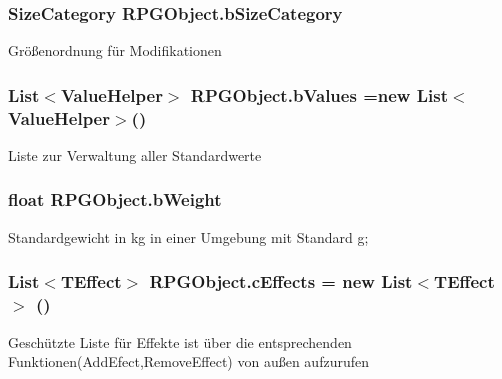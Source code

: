 \subsubsection[{b\+Size\+Category}]{\setlength{\rightskip}{0pt plus 5cm}Size\+Category R\+P\+G\+Object.\+b\+Size\+Category\hspace{0.3cm}{\ttfamily [protected]}}\label{class_r_p_g_object_ae5cb76ccbe4f37237cc03a9737009577}
Größenordnung für Modifikationen \hypertarget{class_r_p_g_object_aca7f376707b78c0852b0001ee67dc80f}{}
\subsubsection[{b\+Values}]{\setlength{\rightskip}{0pt plus 5cm}List$<${\bf Value\+Helper}$>$ R\+P\+G\+Object.\+b\+Values =new List$<${\bf Value\+Helper}$>$()\hspace{0.3cm}{\ttfamily [protected]}}\label{class_r_p_g_object_aca7f376707b78c0852b0001ee67dc80f}
Liste zur Verwaltung aller Standardwerte \hypertarget{class_r_p_g_object_a550507f127d2915aa0b7a95ef5e3feb6}{}
\subsubsection[{b\+Weight}]{\setlength{\rightskip}{0pt plus 5cm}float R\+P\+G\+Object.\+b\+Weight\hspace{0.3cm}{\ttfamily [protected]}}\label{class_r_p_g_object_a550507f127d2915aa0b7a95ef5e3feb6}
Standardgewicht in kg in einer Umgebung mit Standard g; \hypertarget{class_r_p_g_object_a833cf33788a1040a7fdcb703d6e3126d}{}
\subsubsection[{c\+Effects}]{\setlength{\rightskip}{0pt plus 5cm}List$<${\bf T\+Effect}$>$ R\+P\+G\+Object.\+c\+Effects = new List$<${\bf T\+Effect}$>$ ()\hspace{0.3cm}{\ttfamily [protected]}}\label{class_r_p_g_object_a833cf33788a1040a7fdcb703d6e3126d}
Geschützte Liste für Effekte ist über die entsprechenden Funktionen(\+Add\+Efect,\+Remove\+Effect) von außen aufzurufen \hypertarget{class_r_p_g_object_ac5b133eca19e8f97988722018cdf139b}{}
